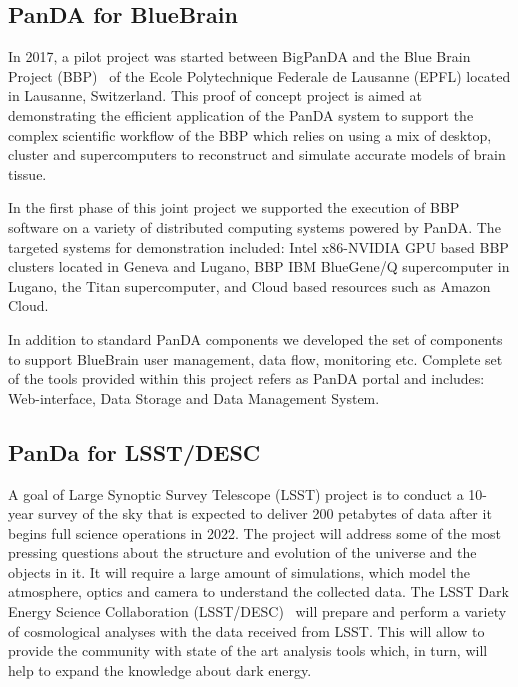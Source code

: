 \documentclass{webofc}
\begin{document}
\subsection{PanDA for BlueBrain} \label{section_bluebrain}

In 2017, a pilot project was started between BigPanDA and the Blue Brain Project (BBP)~\cite{Markram:BBP} of the Ecole Polytechnique Federale de Lausanne (EPFL) located in Lausanne, Switzerland. This proof of concept project is aimed at demonstrating the efficient application of the PanDA system to support the complex scientific workflow of the BBP which relies on using a mix of desktop, cluster and supercomputers to reconstruct and simulate accurate models of brain tissue.

In the first phase of this joint project we supported the execution of BBP software on a variety of distributed computing systems powered by PanDA. 
The targeted systems for demonstration included: Intel x86-NVIDIA GPU based BBP clusters located in Geneva and Lugano, BBP IBM BlueGene/Q supercomputer in Lugano, the Titan supercomputer, and Cloud based resources such as Amazon Cloud.


In addition to standard PanDA components we developed the set of components to support BlueBrain user management, data flow, monitoring etc. 
Complete set of the tools provided within this project refers as PanDA portal and includes: Web-interface, Data Storage and Data Management System. 


\subsection{PanDa for LSST/DESC} \label{section_lsst_desc}

A goal of Large Synoptic Survey Telescope (LSST) project is to conduct a 10-year survey of the sky that is expected to deliver 200 petabytes of data after it begins full science operations in 2022. 
The project will address some of the most pressing questions about the structure and evolution of the universe and the objects in it. 
It will require a large amount of simulations, which model the atmosphere, optics and camera to understand the collected data. 
The LSST Dark Energy Science Collaboration (LSST/DESC)~\cite{lsst-desc} will prepare and perform a variety of cosmological analyses with the data received from LSST. 
This will allow to provide the community with state of the art analysis tools which, in turn, will help to expand the knowledge about dark energy.
\end{document}
